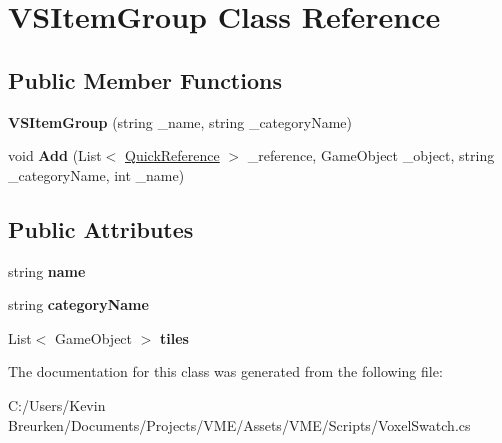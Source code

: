 \hypertarget{class_v_s_item_group}{}\section{V\+S\+Item\+Group Class Reference}
\label{class_v_s_item_group}
\subsection*{Public Member Functions}
\begin{DoxyCompactItemize}
\item 
{\bfseries V\+S\+Item\+Group} (string \+\_\+name, string \+\_\+category\+Name)\hypertarget{class_v_s_item_group_ae1fdef37c6094bacb9cc725684520d3f}{}\label{class_v_s_item_group_ae1fdef37c6094bacb9cc725684520d3f}

\item 
void {\bfseries Add} (List$<$ \hyperlink{class_quick_reference}{Quick\+Reference} $>$ \+\_\+reference, Game\+Object \+\_\+object, string \+\_\+category\+Name, int \+\_\+name)\hypertarget{class_v_s_item_group_a02bafc4f989b0ecc0939ddafdee6fddb}{}\label{class_v_s_item_group_a02bafc4f989b0ecc0939ddafdee6fddb}

\end{DoxyCompactItemize}
\subsection*{Public Attributes}
\begin{DoxyCompactItemize}
\item 
string {\bfseries name}\hypertarget{class_v_s_item_group_a15d7a20bec635daf71c616eb4ecf0feb}{}\label{class_v_s_item_group_a15d7a20bec635daf71c616eb4ecf0feb}

\item 
string {\bfseries category\+Name}\hypertarget{class_v_s_item_group_ad30fcd95dcb4cdbea4a1cd875be014f4}{}\label{class_v_s_item_group_ad30fcd95dcb4cdbea4a1cd875be014f4}

\item 
List$<$ Game\+Object $>$ {\bfseries tiles}\hypertarget{class_v_s_item_group_a4c800fffecc7fb129255e8f9f95375a7}{}\label{class_v_s_item_group_a4c800fffecc7fb129255e8f9f95375a7}

\end{DoxyCompactItemize}


The documentation for this class was generated from the following file\+:\begin{DoxyCompactItemize}
\item 
C\+:/\+Users/\+Kevin Breurken/\+Documents/\+Projects/\+V\+M\+E/\+Assets/\+V\+M\+E/\+Scripts/Voxel\+Swatch.\+cs\end{DoxyCompactItemize}
